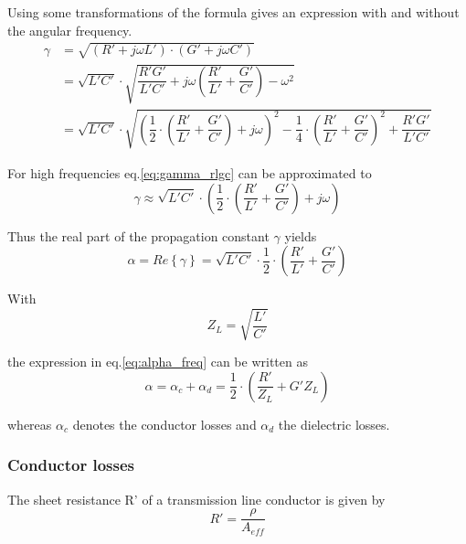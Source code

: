 Using some transformations of the formula gives an expression with and
without the angular frequency.
\begin{equation}
\label{eq:gamma_rlgc}
\begin{split}
\gamma &= \sqrt{\left(R' + j\omega L'\right)\cdot \left(G' + j\omega C'\right)}\\
&= \sqrt{L'C'}\cdot\sqrt{\dfrac{R'G'}{L'C'} + j\omega\left(\dfrac{R'}{L'} + \dfrac{G'}{C'}\right) - \omega^2}\\
&= \sqrt{L'C'}\cdot\sqrt{\left(\dfrac{1}{2}\cdot\left(\dfrac{R'}{L'} + \dfrac{G'}{C'}\right) + j\omega\right)^2 - \dfrac{1}{4}\cdot\left(\dfrac{R'}{L'} + \dfrac{G'}{C'}\right)^2 + \dfrac{R'G'}{L'C'}}
\end{split}
\end{equation}

For high frequencies eq.{\eqref{eq:gamma_rlgc}} can be approximated to
\begin{equation}
\gamma \approx \sqrt{L'C'}\cdot\left(\dfrac{1}{2}\cdot\left(\dfrac{R'}{L'} + \dfrac{G'}{C'}\right) + j\omega\right)
\end{equation}

Thus the real part of the propagation constant $\gamma$ yields
\begin{equation}
\label{eq:alpha_freq}
\alpha = Re\left\{\gamma\right\} = \sqrt{L'C'}\cdot\dfrac{1}{2}\cdot\left(\dfrac{R'}{L'} + \dfrac{G'}{C'}\right)
\end{equation}

With
\begin{equation}
Z_L = \sqrt{\dfrac{L'}{C'}}
\end{equation}

the expression in eq.\eqref{eq:alpha_freq} can be written as
\begin{equation}
\alpha = \alpha_c + \alpha_d = \dfrac{1}{2}\cdot\left(\dfrac{R'}{Z_L} + G'Z_L\right)
\end{equation}

whereas $\alpha_c$ denotes the conductor losses and $\alpha_d$ the
dielectric losses.

\subsubsection{Conductor losses}

The sheet resistance R' of a transmission line conductor is given by
\begin{equation}
R' = \dfrac{\rho}{A_{eff}}
\end{equation}

